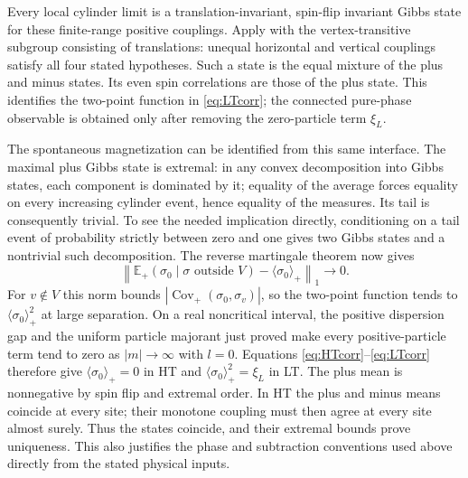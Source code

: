 \documentclass[11pt]{article}
\numberwithin{equation}{section}
\theoremstyle{definition}
\begin{document}
Every local cylinder limit is a translation-invariant, spin-flip invariant
Gibbs state for these finite-range positive couplings. Apply
\cite[Theorem 1]{Raoufi} with the vertex-transitive subgroup consisting
of translations: unequal horizontal and vertical couplings satisfy all
four stated hypotheses. Such a state is the equal mixture of the plus
and minus states. Its even spin correlations are those of the plus
state. This identifies the two-point function in \eqref{eq:LTcorr};
the connected pure-phase observable is obtained only after removing
the zero-particle term $\xi_L$.

The spontaneous magnetization can be identified from this same
interface.  The maximal plus Gibbs state is extremal: in any convex
decomposition into Gibbs states, each component is dominated by it;
equality of the average forces equality on every increasing cylinder
event, hence equality of the measures.  Its tail is consequently
trivial.  To see the needed implication directly, conditioning on a
tail event of probability strictly between zero and one gives two
Gibbs states and a nontrivial such decomposition.  The reverse
martingale theorem now gives
\[
 \left\|\mathbb E_+(\sigma_0\mid
          \sigma\text{ outside }V)-\langle\sigma_0\rangle_+\right\|_1
       \longrightarrow0.
\]
For $v\notin V$ this norm bounds
$|\operatorname{Cov}_+(\sigma_0,\sigma_v)|$, so the two-point
function tends to $\langle\sigma_0\rangle_+^2$ at large separation.
On a real noncritical interval, the positive dispersion gap and the
uniform particle majorant just proved make every positive-particle
term tend to zero as $|m|\to\infty$ with $l=0$.
Equations \eqref{eq:HTcorr}--\eqref{eq:LTcorr} therefore give
$\langle\sigma_0\rangle_+=0$ in HT and
$\langle\sigma_0\rangle_+^2=\xi_L$ in LT.  The plus mean is
nonnegative by spin flip and extremal order.  In HT the plus and
minus means coincide at every site; their monotone coupling must
then agree at every site almost surely.  Thus the states coincide,
and their extremal bounds prove uniqueness.  This also justifies the
phase and subtraction conventions used above directly from the
stated physical inputs.
\end{document}
